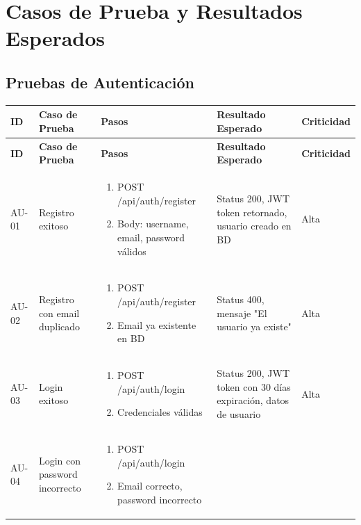 \documentclass[12pt,a4paper]{article}
\begin{document}
\section{Casos de Prueba y Resultados Esperados}

\subsection{Pruebas de Autenticación}

\begin{longtable}{|p{1cm}|p{3cm}|p{4cm}|p{3cm}|p{3cm}|}
\hline
\textbf{ID} & \textbf{Caso de Prueba} & \textbf{Pasos} & \textbf{Resultado Esperado} & \textbf{Criticidad} \\
\hline
\endfirsthead
\hline
\textbf{ID} & \textbf{Caso de Prueba} & \textbf{Pasos} & \textbf{Resultado Esperado} & \textbf{Criticidad} \\
\hline
\endhead
AU-01 & Registro exitoso &
\begin{enumerate}[leftmargin=*,nosep]
    \item POST /api/auth/register
    \item Body: username, email, password válidos
\end{enumerate} &
Status 200, JWT token retornado, usuario creado en BD & Alta \\
\hline
AU-02 & Registro con email duplicado &
\begin{enumerate}[leftmargin=*,nosep]
    \item POST /api/auth/register
    \item Email ya existente en BD
\end{enumerate} &
Status 400, mensaje "El usuario ya existe" & Alta \\
\hline
AU-03 & Login exitoso &
\begin{enumerate}[leftmargin=*,nosep]
    \item POST /api/auth/login
    \item Credenciales válidas
\end{enumerate} &
Status 200, JWT token con 30 días expiración, datos de usuario & Alta \\
\hline
AU-04 & Login con password incorrecto &
\begin{enumerate}[leftmargin=*,nosep]
    \item POST /api/auth/login
    \item Email correcto, password incorrecto

\end{enumerate}
\end{longtable}
\end{document}
